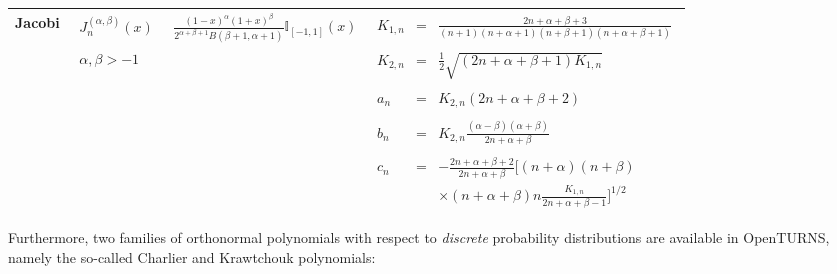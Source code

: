 {\begin{center}
\begin{tabular}{|c|c|c|c|}
          \hline
          Jacobi  &  $\begin{array}{c} J^{(\alpha,\beta)}_n(x) \\ \\ \\ \alpha,\beta>-1 \\ \end{array}$  &  $ \frac{(1-x)^{\alpha}(1+x)^{\beta}}{2^{\alpha + \beta + 1} B(\beta + 1, \alpha + 1)} \mathbb{I}_{[-1,1]}(x)$  &  $\begin{array}{ccc}  K_{1,n} & = & \frac{2n+\alpha + \beta + 3}{(n+1)(n+\alpha+1)(n+\beta+1)(n+\alpha+\beta+1)} \\ \\ K_{2,n} & = & \frac{1}{2} \sqrt{(2n + \alpha + \beta + 1) K_{1,n}} \\ \\a_n & = & K_{2,n}(2n+\alpha + \beta + 2)  \\   \\  b_n & = & K_{2,n}\frac{(\alpha - \beta)(\alpha + \beta)}{2n+\alpha+\beta} \\ \\ c_n & = & - \frac{2n+\alpha+\beta + 2}{2n+\alpha+\beta} \Big[(n+\alpha)(n+\beta) \\ & & \times (n+\alpha+\beta)n\frac{K_{1,n}}{2n+\alpha+\beta-1}\Big]^{1/2}  \end{array} $ \\
          \hline

    \end{tabular}

  \end{center}


  Furthermore, two families of orthonormal polynomials with respect to \emph{discrete} probability distributions are available in OpenTURNS, namely the so-called Charlier and Krawtchouk polynomials:

}
